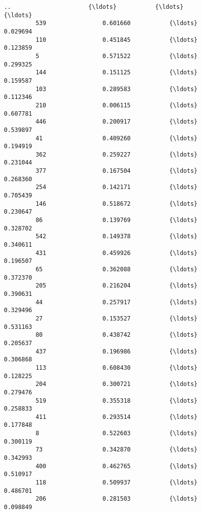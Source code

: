 \documentclass[11pt]{article}
\begin{document}
\begin{Verbatim}[commandchars=\\\{\}]
         ..                      {\ldots}           {\ldots}                      {\ldots}   
         539                0.601660           {\ldots}                 0.029694   
         110                0.451845           {\ldots}                 0.123859   
         5                  0.571522           {\ldots}                 0.299325   
         144                0.151125           {\ldots}                 0.159587   
         103                0.289583           {\ldots}                 0.112346   
         210                0.006115           {\ldots}                 0.607781   
         446                0.200917           {\ldots}                 0.539897   
         41                 0.409260           {\ldots}                 0.194919   
         362                0.259227           {\ldots}                 0.231044   
         377                0.167504           {\ldots}                 0.268360   
         254                0.142171           {\ldots}                 0.705439   
         146                0.518672           {\ldots}                 0.230647   
         86                 0.139769           {\ldots}                 0.328702   
         542                0.149378           {\ldots}                 0.340611   
         431                0.459926           {\ldots}                 0.196507   
         65                 0.362088           {\ldots}                 0.372370   
         205                0.216204           {\ldots}                 0.390631   
         44                 0.257917           {\ldots}                 0.329496   
         27                 0.153527           {\ldots}                 0.531163   
         80                 0.438742           {\ldots}                 0.205637   
         437                0.196986           {\ldots}                 0.306868   
         113                0.608430           {\ldots}                 0.128225   
         204                0.300721           {\ldots}                 0.279476   
         519                0.355318           {\ldots}                 0.258833   
         411                0.293514           {\ldots}                 0.177848   
         8                  0.522603           {\ldots}                 0.300119   
         73                 0.342870           {\ldots}                 0.342993   
         400                0.462765           {\ldots}                 0.510917   
         118                0.509937           {\ldots}                 0.486701   
         206                0.281503           {\ldots}                 0.098849   
         

\end{Verbatim}
\end{document}
